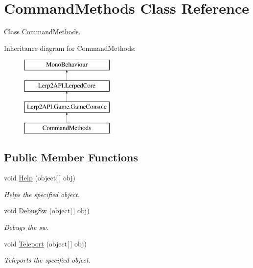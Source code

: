 \hypertarget{class_command_methods}{}\section{Command\+Methods Class Reference}
\label{class_command_methods}


Class \hyperlink{class_command_methods}{Command\+Methods}.  


Inheritance diagram for Command\+Methods\+:\begin{figure}[H]
\begin{center}
\leavevmode
\includegraphics[height=4.000000cm]{class_command_methods}
\end{center}
\end{figure}
\subsection*{Public Member Functions}
\begin{DoxyCompactItemize}
\item 
void \hyperlink{class_command_methods_a28f74ac49ae31b888b9917c73982bda2}{Help} (object\mbox{[}$\,$\mbox{]} obj)
\begin{DoxyCompactList}\small\item\em Helps the specified object. \end{DoxyCompactList}\item 
void \hyperlink{class_command_methods_ac8836c23d6d7d6dc387e07200ed966a2}{Debug\+Sw} (object\mbox{[}$\,$\mbox{]} obj)
\begin{DoxyCompactList}\small\item\em Debugs the sw. \end{DoxyCompactList}\item 
void \hyperlink{class_command_methods_a68f64d907d6b8b2348b3ec9960aac399}{Teleport} (object\mbox{[}$\,$\mbox{]} obj)
\begin{DoxyCompactList}\small\item\em Teleports the specified object. \end{DoxyCompactList}\end{DoxyCompactItemize}
